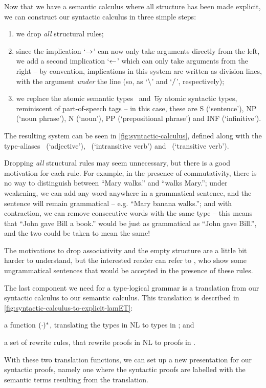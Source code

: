 \documentclass[a4paper]{article}
\begin{document}
Now that we have a semantic calculus where all structure has been made
explicit, we can construct our syntactic calculus in three simple
steps:
\begin{enumerate}
\item%
  we drop \emph{all} structural rules;
\item%
  since the implication `$\rightarrow$' can now only take arguments directly
  from the left, we add a second implication `$\leftarrow$' which can only
  take arguments from the right -- by convention, implications in this
  system are written as division lines, with the argument \emph{under}
  the line (so, as `$\mathbin{\backslash}$' and `$\mathbin{\slash}$', respectively);
\item%
  we replace the atomic semantic types \e\ and \t\ by atomic syntactic
  types, reminiscent of part-of-speech tags -- in this case, these
  are S (`sentence'), NP (`noun phrase'), N (`noun'), PP
  (`prepositional phrase') and INF (`infinitive').
\end{enumerate}
The resulting system can be seen in \autoref{fig:syntactic-calculus},
defined along with the type-aliases \A\ (`adjective'), \IV\
(`intransitive verb') and \TV\ (`transitive verb').



Dropping \emph{all} structural rules may seem unnecessary, but there
is a good motivation for each rule.  For example, in the presence of
commutativity, there is no way to distinguish between ``Mary walks.''
and ``walks Mary.''; under weakening, we can add any word anywhere in a
grammatical sentence, and the sentence will remain grammatical --
e.g. ``Mary banana walks.''; and with contraction, we can remove
consecutive words with the same type -- this means that ``John gave
Bill a book.'' would be just as grammatical as ``John gave Bill.'',
and the two could be taken to mean the same!

The motivations to drop associativity and the empty structure are a
little bit harder to understand, but the interested reader can refer
to \citet[p. 33, 105-106]{moot2012}, who show some ungrammatical
sentences that would be accepted in the presence of these rules.

The last component we need for a type-logical grammar is a translation
from our syntactic calculus to our semantic calculus. This translation
is described in \autoref{fig:syntactic-calculus-to-explicit-lamET}:
\begin{enumerate*}[label=(\arabic*)]
\item a function $({\cdot})^*$, translating the types in NL to types in
  \lamET; and
\item a set of rewrite rules, that rewrite proofs in NL to proofs in
  \lamET.
\end{enumerate*}
With these two translation functions, we can set up a new presentation
for our syntactic proofs, namely one where the syntactic proofs are
labelled with the semantic terms resulting from the translation.
\end{document}
